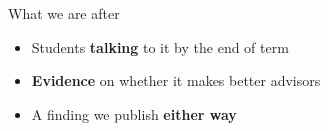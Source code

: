 \documentclass[aspectratio=169,11pt]{beamer}
\newlength{\contentwidth}
\newcommand{\hl}[1]{\textcolor{ffcBlue}{\textbf{#1}}}
\begin{document}
\begin{frame}{What we are after}
  \vspace{0.8em}
  \begin{center}
  \begin{minipage}{\contentwidth}\large
    \begin{itemize}\setlength{\itemsep}{0.9em}
      \item<1-> Students \hl{talking} to it by the end of term
      \item<2-> \hl{Evidence} on whether it makes better advisors
      \item<3-> A finding we publish \hl{either way}
    \end{itemize}
  \end{minipage}
  \end{center}
  \vfill
  \begin{center}
  \end{center}
  \vspace{0.8em}
\end{frame}
\end{document}
